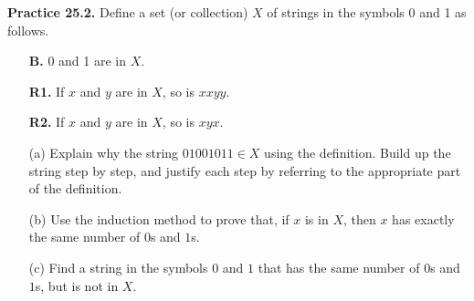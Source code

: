 \documentclass[aspectratio=169]{beamer}
\begin{document}
\fi

\begin{frame}[plain]{ }

 {\bf Practice 25.2.} Define a set (or collection) $X$ of strings in the symbols 0 and 1 as follows.
    \begin{itemize}
      \item[{\bf B.}] 0 and 1 are in $X$.
      \item[{\bf R1.}] If $x$ and $y$ are in $X$, so is $xxyy$.
      \item[{\bf R2.}] If $x$ and $y$ are in $X$, so is $xyx$.
    \end{itemize}
    
    \begin{itemize}
      \item[(a)] Explain why the string $01001011 \in X$ using the definition. Build up the string step by step,
    and justify each step by referring to the appropriate part of the definition.
      \item[(b)] Use the induction method to prove that, if $x$ is in $X$, then $x$ has exactly 
       the same number of $0$s and $1$s.
  \smallskip
      \item[(c)] Find a string in the symbols $0$ and $1$ that has the same number of $0$s and $1$s, but
    is not in $X$. %
   \end{itemize}
   
 
\vspace{.5in}

\end{frame}
\end{document}
